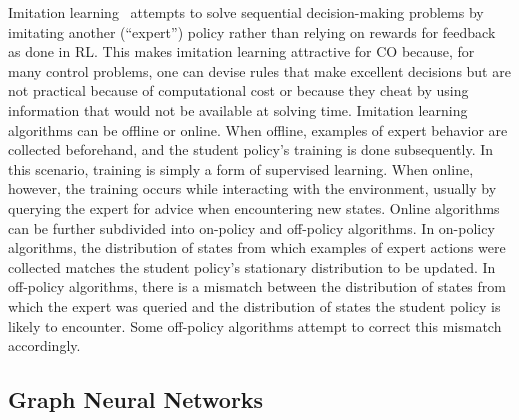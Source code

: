\documentclass[twoside,11pt]{article}
\begin{document}
Imitation learning~\citep{ross2013interactive} attempts to solve sequential decision-making problems by {imitating} another (``expert'') policy rather than relying on rewards for feedback as done in RL. This makes imitation learning attractive for CO because, for many control problems, one can devise rules that make excellent decisions but are not practical because of computational cost or because they cheat by using information that would not be available at solving time.
Imitation learning algorithms can be offline or online. When offline, examples of expert behavior are collected beforehand, and the student policy's training is done subsequently. In this scenario, training is simply a form of supervised learning. When online, however, the training occurs while interacting with the environment, usually by querying the expert for advice when encountering new states. Online algorithms can be further subdivided into on-policy and off-policy algorithms. In on-policy algorithms, the distribution of states from which examples of expert actions were collected matches the student policy's stationary distribution to be updated. In off-policy algorithms, there is a mismatch between the distribution of states from which the expert was queried and the distribution of states the student policy is likely to encounter. Some off-policy algorithms attempt to correct this mismatch accordingly.

\subsection{Graph Neural Networks}
\end{document}
